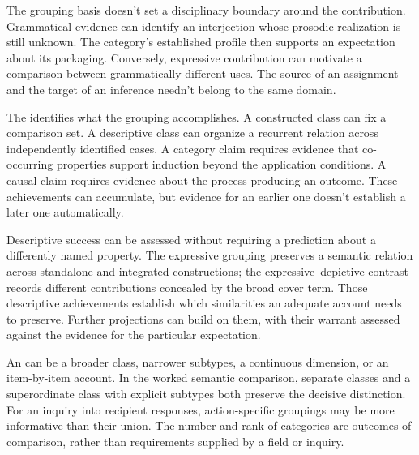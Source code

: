 \documentclass[12pt]{article}
\begin{document}
The grouping basis doesn't set a disciplinary boundary around the
contribution. Grammatical evidence can identify an interjection whose
prosodic realization is still unknown. The category's established profile
then supports an expectation about its packaging. Conversely, expressive
contribution can motivate a comparison between grammatically different
 uses. The source of an assignment and the target
of an inference needn't belong to the same domain.

The  identifies what the grouping accomplishes. A
constructed class can fix a comparison set. A descriptive class can
organize a recurrent relation across independently identified cases.
A category claim requires evidence that co-occurring properties support
induction beyond the application conditions. A causal claim requires
evidence about the process producing an outcome. These achievements
can accumulate, but evidence for an earlier one doesn't establish a
later one automatically.

Descriptive success can be assessed without requiring a prediction about
a differently named property. The expressive grouping preserves a semantic relation across
standalone and integrated constructions; the expressive--depictive contrast
records different contributions concealed by the broad cover term.
Those descriptive achievements establish which similarities an adequate
account needs to preserve. Further projections can build on them,
with their warrant assessed against the evidence for the particular
expectation.

An  can be a broader class, narrower subtypes, a
continuous dimension, or an item-by-item account. In the worked semantic
comparison, separate classes and a superordinate class with explicit
subtypes both preserve the decisive distinction. For an inquiry into
recipient responses, action-specific groupings may be more informative
than their union. The number and rank of categories are outcomes of
comparison, rather than requirements supplied by a field or inquiry.
\end{document}

